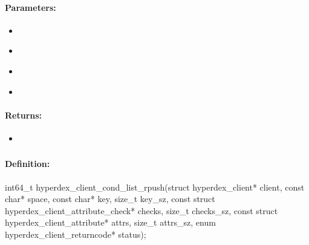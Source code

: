 \paragraph{Parameters:}
\begin{itemize}[noitemsep]
\item {}\\

\item {}\\

\item {}\\

\item {}\\

\end{itemize}

\paragraph{Returns:}
\begin{itemize}[noitemsep]
\item {}\\

\end{itemize}

\pagebreak
\subsubsection{}
\label{api:c:cond_list_rpush}


\paragraph{Definition:}
\begin{ccode}
int64_t hyperdex_client_cond_list_rpush(struct hyperdex_client* client,
        const char* space,
        const char* key, size_t key_sz,
        const struct hyperdex_client_attribute_check* checks, size_t checks_sz,
        const struct hyperdex_client_attribute* attrs, size_t attrs_sz,
        enum hyperdex_client_returncode* status);
\end{ccode}

